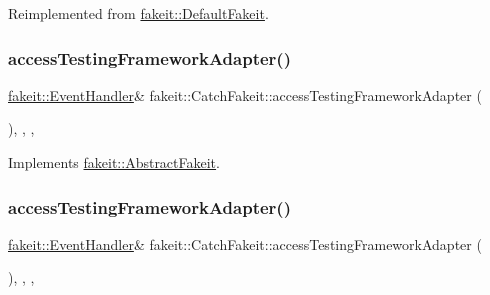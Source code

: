 Reimplemented from \mbox{\hyperlink{classfakeit_1_1DefaultFakeit_a02cb8f08a94e7bf830c87f74f20c9bd9}{fakeit\+::\+Default\+Fakeit}}.

\mbox{\label{classfakeit_1_1CatchFakeit_aadcd043eb8a6ded0ff11677b2a414b37}} 
\subsubsection{\texorpdfstring{accessTestingFrameworkAdapter()}{accessTestingFrameworkAdapter()}\hspace{0.1cm}{\footnotesize\ttfamily [1/2]}}
{\footnotesize\ttfamily \mbox{\hyperlink{structfakeit_1_1EventHandler}{fakeit\+::\+Event\+Handler}}\& fakeit\+::\+Catch\+Fakeit\+::access\+Testing\+Framework\+Adapter (\begin{DoxyParamCaption}{ }\end{DoxyParamCaption})\hspace{0.3cm}{\ttfamily [inline]}, {\ttfamily [override]}, {\ttfamily [protected]}, {\ttfamily [virtual]}}



Implements \mbox{\hyperlink{classfakeit_1_1AbstractFakeit_a9476180a503524d49d1978fbbc125b01}{fakeit\+::\+Abstract\+Fakeit}}.

\mbox{\label{classfakeit_1_1CatchFakeit_aadcd043eb8a6ded0ff11677b2a414b37}} 
\subsubsection{\texorpdfstring{accessTestingFrameworkAdapter()}{accessTestingFrameworkAdapter()}\hspace{0.1cm}{\footnotesize\ttfamily [2/2]}}
{\footnotesize\ttfamily \mbox{\hyperlink{structfakeit_1_1EventHandler}{fakeit\+::\+Event\+Handler}}\& fakeit\+::\+Catch\+Fakeit\+::access\+Testing\+Framework\+Adapter (\begin{DoxyParamCaption}{ }\end{DoxyParamCaption})\hspace{0.3cm}{\ttfamily [inline]}, {\ttfamily [override]}, {\ttfamily [protected]}, {\ttfamily [virtual]}}



